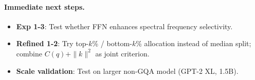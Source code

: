 \documentclass[11pt,a4paper]{article}
\begin{document}
\paragraph{Immediate next steps.}
\begin{itemize}[nosep]
  \item \textbf{Exp 1-3}: Test whether FFN enhances spectral frequency selectivity.
  \item \textbf{Refined 1-2}: Try top-$k$\% / bottom-$k$\% allocation instead of median split; combine $C(q) + \|k\|^2$ as joint criterion.
  \item \textbf{Scale validation}: Test on larger non-GQA model (GPT-2 XL, 1.5B).
\end{itemize}
\end{document}
